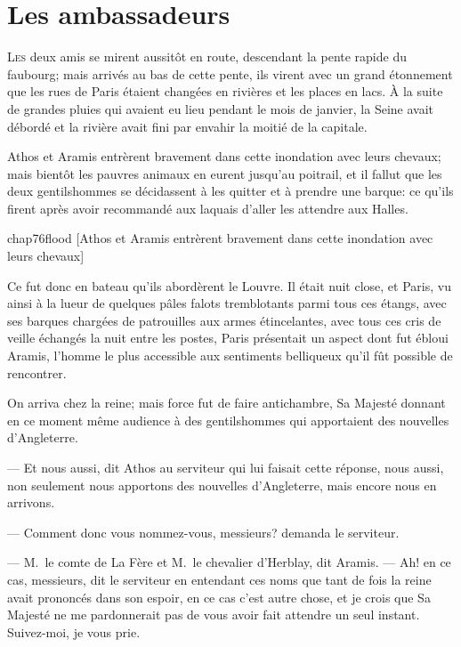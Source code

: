 \chapter{Les ambassadeurs}

\lettrine{L}{es} deux amis se mirent aussitôt en route, descendant la pente rapide du faubourg; mais arrivés au bas de cette pente, ils virent avec un grand étonnement que les rues de Paris étaient changées en rivières et les places en lacs. À la suite de grandes pluies qui avaient eu lieu pendant le mois de janvier, la Seine avait débordé et la rivière avait fini par envahir la moitié de la capitale.

Athos et Aramis entrèrent bravement dans cette inondation avec leurs chevaux; mais bientôt les pauvres animaux en eurent jusqu'au poitrail, et il fallut que les deux gentilshommes se décidassent à les quitter et à prendre une barque: ce qu'ils firent après avoir recommandé aux laquais d'aller les attendre aux Halles.

\begin{bwbigpic}
	[\basicscale] 
	{chap76flood}
	[Athos et Aramis entrèrent bravement dans cette inondation avec leurs chevaux]
\end{bwbigpic}

Ce fut donc en bateau qu'ils abordèrent le Louvre. Il était nuit close, et Paris, vu ainsi à la lueur de quelques pâles falots tremblotants parmi tous ces étangs, avec ses barques chargées de patrouilles aux armes étincelantes, avec tous ces cris de veille échangés la nuit entre les postes, Paris présentait un aspect dont fut ébloui Aramis, l'homme le plus accessible aux sentiments belliqueux qu'il fût possible de rencontrer.

On arriva chez la reine; mais force fut de faire antichambre, Sa Majesté donnant en ce moment même audience à des gentilshommes qui apportaient des nouvelles d'Angleterre.

— Et nous aussi, dit Athos au serviteur qui lui faisait cette réponse, nous aussi, non seulement nous apportons des nouvelles d'Angleterre, mais encore nous en arrivons.

— Comment donc vous nommez-vous, messieurs? demanda le serviteur.

— M.~le comte de La Fère et M.~le chevalier d'Herblay, dit Aramis.
— Ah! en ce cas, messieurs, dit le serviteur en entendant ces noms que tant de fois la reine avait prononcés dans son espoir, en ce cas c'est autre chose, et je crois que Sa Majesté ne me pardonnerait pas de vous avoir fait attendre un seul instant. Suivez-moi, je vous prie.

